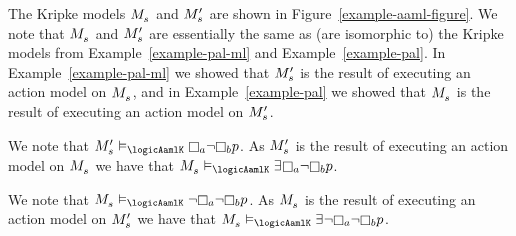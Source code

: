 \begin{example}
\begin{figure}
\end{figure}

The Kripke models $\kPModel{\kStateS}$ and $\kPModelP{\kStateS}$ are shown in Figure~\ref{example-aaml-figure}.
We note that $\kPModel{\kStateS}$ and $\kPModelP{\kStateS}$ are essentially the same as (are isomorphic to) the Kripke models from Example~\ref{example-pal-ml} and Example~\ref{example-pal}.
In Example~\ref{example-pal-ml} we showed that $\kPModelP{\kStateS}$ is the result of executing an action model on $\kPModel{\kStateS}$, and in Example~\ref{example-pal} we showed that $\kPModel{\kStateS}$ is the result of executing an action model on $\kPModelP{\kStateS}$.

We note that $\kPModelP{\kStateS} \entails_\logicAamlK \knowsA \lnot \knowsB \atomP$.
As $\kPModelP{\kStateS}$ is the result of executing an action model on $\kPModel{\kStateS}$ we have that $\kPModel{\kStateS} \entails_\logicAamlK \someacts \knowsA \lnot \knowsB \atomP$.

We note that $\kPModel{\kStateS} \entails_\logicAamlK \lnot \knowsA \lnot \knowsB \atomP$.
As $\kPModel{\kStateS}$ is the result of executing an action model on $\kPModelP{\kStateS}$ we have that $\kPModel{\kStateS} \entails_\logicAamlK \someacts \lnot \knowsA \lnot \knowsB \atomP$.
\end{example}

